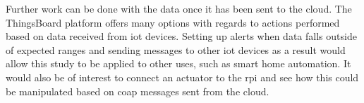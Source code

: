 Further work can be done with the data once it has been sent to the cloud.
The ThingsBoard platform offers many options with regards to actions performed
based on data received from \gls{iot} devices. Setting up alerts when data
falls outside of expected ranges and sending messages to other \gls{iot} 
devices as a result would allow this study to be applied to other uses, such
as smart home automation. It would also be of interest to connect an 
actuator to the \gls{rpi} and see how this could be manipulated based on
\gls{coap} messages sent from the cloud. 